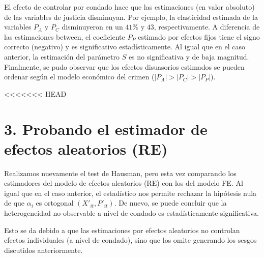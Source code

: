 \documentclass[
]{article}
\begin{document}
El efecto de controlar por condado hace que las estimaciones (en valor
absoluto) de las variables de justicia disminuyan. Por ejemplo, la
elasticidad estimada de la variables \(P_A\) y \(P_C\) disminuyeron en
un \(41\%\) y \(43%
\), respectivamente. A diferencia de las estimaciones between, el
coeficiente \(P_P\) estimado por efectos fijos tiene el signo correcto
(negativo) y es significativo estadísticamente. Al igual que en el caso
anterior, la estimación del parámetro \(S\) es no significativa y de
baja magnitud. Finalmente, se pudo observar que los efectos disuasorios
estimados se pueden ordenar según el modelo económico del crimen
(\(|P_A|>|P_C|>|P_P|\)).

<<<<<<< HEAD
\hypertarget{probando-el-estimador-de-efectos-aleatorios-re}{%
\section{3. Probando el estimador de efectos aleatorios
(RE)}\label{probando-el-estimador-de-efectos-aleatorios-re}}

Realizamos nuevamente el test de Hausman, pero esta vez comparando los
estimadores del modelo de efectos aleatorios (RE) con los del modelo FE.
Al igual que en el caso anterior, el estadístico nos permite rechazar la
hipótesis nula de que \(\alpha_i\) es ortogonal \((X'_{it},P'_{it})\).
De nuevo, se puede concluir que la heterogeneidad no-observable a nivel
de condado es estadísticamente significativa.

Esto se da debido a que las estimaciones por efectos aleatorios no
controlan efectos individuales (a nivel de condado), sino que los omite
generando los sesgos discutidos anteriormente.
\end{document}
